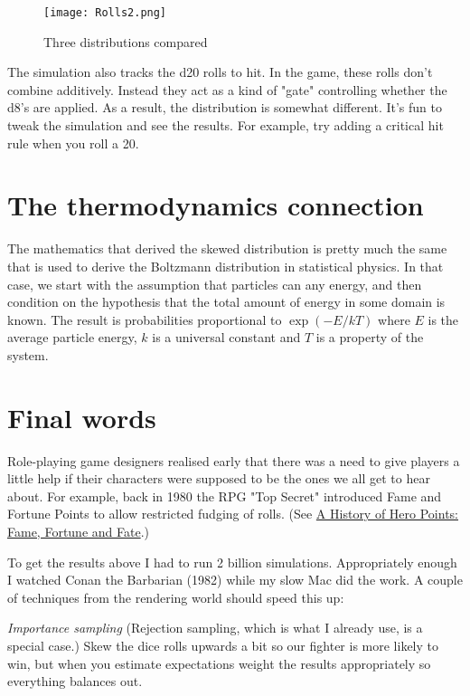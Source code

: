 \documentclass[12pt]{article}
\begin{document}
\begin{figure}
\begin{center}
\texttt{[image: Rolls2.png]}
\caption{Three distributions compared}
\label{rolls:2}
\end{center}
\end{figure}

The simulation also tracks the d20 rolls to hit.
In the game, these rolls don't combine additively.
Instead they act as a kind of "gate" controlling whether the d8's are applied.
As a result, the distribution is somewhat different.
It's fun to tweak the simulation and see the results.
For example, try adding a critical hit rule when you roll a 20.

\section{The thermodynamics connection}
The mathematics that derived the skewed distribution is pretty much the same that is used to derive the Boltzmann distribution in statistical physics.
In that case, we start with the assumption that particles can any energy, and then condition on the hypothesis that the total amount of energy in some domain is known.
The result is probabilities proportional to $\exp(-E/kT)$ where $E$ is the average particle energy, $k$ is a universal constant and $T$ is a property of the system.

\section{Final words}
Role-playing game designers realised early that there was a need to give players a little help if their characters were supposed to be the ones we all get to hear about.
For example, back in 1980 the RPG "Top Secret" introduced Fame and Fortune Points to allow restricted fudging of rolls.
(See \href{http://playingattheworld.blogspot.com/2021/01/a-history-of-hero-points-fame-fortune.html}{A History of Hero Points: Fame, Fortune and Fate}.)

To get the results above I had to run 2 billion simulations.
Appropriately enough I watched Conan the Barbarian (1982) while my slow Mac did the work.
A couple of techniques from the rendering world should speed this up:

\emph{Importance sampling} (Rejection sampling, which is what I already use, is a special case.) Skew the dice rolls upwards a bit so our fighter is more likely to win, but when you estimate expectations weight the results appropriately so everything balances out.
\end{document}

